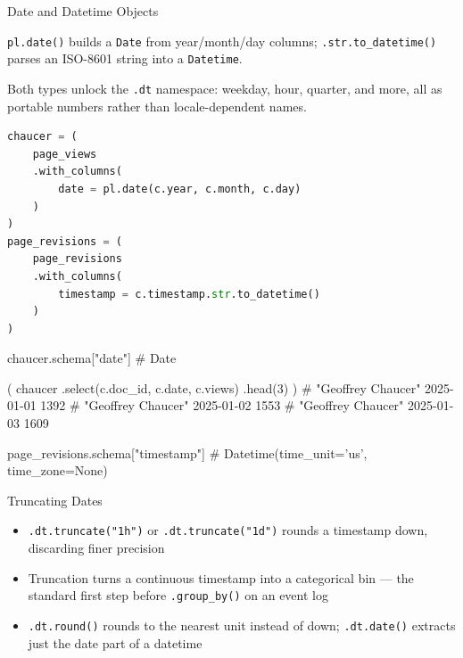 \documentclass[8pt,aspectratio=169]{beamer}
\begin{document}
\begin{frame}[fragile]{Date and Datetime Objects}
\begin{splitcode}{%

\texttt{pl.date()} builds a \texttt{Date} from year/month/day columns; \texttt{.str.to\_datetime()} parses an ISO-8601 string into a \texttt{Datetime}.

Both types unlock the \texttt{.dt} namespace: weekday, hour, quarter, and more, all as portable numbers rather than locale-dependent names.

}
\begin{lstlisting}[language=Python]
chaucer = (
    page_views
    .with_columns(
        date = pl.date(c.year, c.month, c.day)
    )
)
page_revisions = (
    page_revisions
    .with_columns(
        timestamp = c.timestamp.str.to_datetime()
    )
)
\end{lstlisting}
\begin{codeoutput}
chaucer.schema["date"]
# Date

(
    chaucer
    .select(c.doc_id, c.date, c.views)
    .head(3)
)
# "Geoffrey Chaucer"  2025-01-01  1392
# "Geoffrey Chaucer"  2025-01-02  1553
# "Geoffrey Chaucer"  2025-01-03  1609

page_revisions.schema["timestamp"]
# Datetime(time_unit='us', time_zone=None)
\end{codeoutput}
\end{splitcode}
\end{frame}

\begin{textframe}{Truncating Dates}

\begin{itemize}
\item \texttt{.dt.truncate("1h")} or \texttt{.dt.truncate("1d")} rounds a timestamp down, discarding finer precision
\item Truncation turns a continuous timestamp into a categorical bin --- the standard first step before \texttt{.group\_by()} on an event log
\item \texttt{.dt.round()} rounds to the nearest unit instead of down; \texttt{.dt.date()} extracts just the date part of a datetime
\end{itemize}

\end{textframe}
\end{document}
